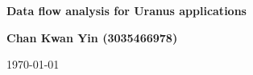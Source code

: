 \begin{titlepage}
	\begin{center}
		\vspace*{1em}
		\Huge
		\textbf{Data flow analysis for Uranus applications}

		\Large
		\vspace{1.5em}
		\textbf{Chan Kwan Yin (3035466978)}

		\vspace{0.5em}
		\today
	\end{center}
\end{titlepage}
